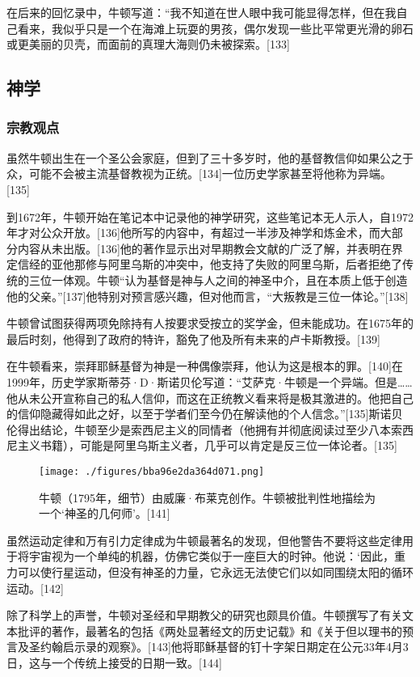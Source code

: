在后来的回忆录中，牛顿写道：“我不知道在世人眼中我可能显得怎样，但在我自己看来，我似乎只是一个在海滩上玩耍的男孩，偶尔发现一些比平常更光滑的卵石或更美丽的贝壳，而面前的真理大海则仍未被探索。[133]
\subsection{神学}
\subsubsection{宗教观点}
虽然牛顿出生在一个圣公会家庭，但到了三十多岁时，他的基督教信仰如果公之于众，可能不会被主流基督教视为正统。[134]一位历史学家甚至将他称为异端。[135]

到1672年，牛顿开始在笔记本中记录他的神学研究，这些笔记本无人示人，自1972年才对公众开放。[136]他所写的内容中，有超过一半涉及神学和炼金术，而大部分内容从未出版。[136]他的著作显示出对早期教会文献的广泛了解，并表明在界定信经的亚他那修与阿里乌斯的冲突中，他支持了失败的阿里乌斯，后者拒绝了传统的三位一体观。牛顿“认为基督是神与人之间的神圣中介，且在本质上低于创造他的父亲。”[137]他特别对预言感兴趣，但对他而言，“大叛教是三位一体论。”[138]

牛顿曾试图获得两项免除持有人按要求受按立的奖学金，但未能成功。在1675年的最后时刻，他得到了政府的特许，豁免了他及所有未来的卢卡斯教授。[139]

在牛顿看来，崇拜耶稣基督为神是一种偶像崇拜，他认为这是根本的罪。[140]在1999年，历史学家斯蒂芬·D·斯诺贝伦写道：“艾萨克·牛顿是一个异端。但是……他从未公开宣称自己的私人信仰，而这在正统教义看来将是极其激进的。他把自己的信仰隐藏得如此之好，以至于学者们至今仍在解读他的个人信念。”[135]斯诺贝伦得出结论，牛顿至少是索西尼主义的同情者（他拥有并彻底阅读过至少八本索西尼主义书籍），可能是阿里乌斯主义者，几乎可以肯定是反三位一体论者。[135]
\begin{figure}[ht]
\centering
\texttt{[image: ./figures/bba96e2da364d071.png]}
\caption{牛顿（1795年，细节）由威廉·布莱克创作。牛顿被批判性地描绘为一个‘神圣的几何师’。[141]} \label{fig_Newton_11}
\end{figure}
虽然运动定律和万有引力定律成为牛顿最著名的发现，但他警告不要将这些定律用于将宇宙视为一个单纯的机器，仿佛它类似于一座巨大的时钟。他说：‘因此，重力可以使行星运动，但没有神圣的力量，它永远无法使它们以如同围绕太阳的循环运动。[142]

除了科学上的声誉，牛顿对圣经和早期教父的研究也颇具价值。牛顿撰写了有关文本批评的著作，最著名的包括《两处显著经文的历史记载》和《关于但以理书的预言及圣约翰启示录的观察》。[143]他将耶稣基督的钉十字架日期定在公元33年4月3日，这与一个传统上接受的日期一致。[144]

